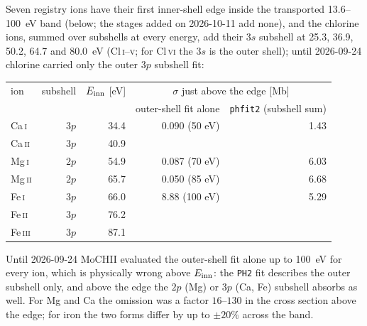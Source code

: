 \documentclass[english,a4paper]{my_memo}
\newcommand{\code}[1]{\texttt{#1}}
\begin{document}
Seven registry ions have their first inner-shell edge inside the
transported 13.6--100~eV band (below; the stages added on 2026-10-11 add
none), and the chlorine ions, summed over subshells at every energy, add
their $3s$ subshell at 25.3, 36.9, 50.2, 64.7 and 80.0~eV
(Cl\,\textsc{i}--\textsc{v}; for Cl\,\textsc{vi} the $3s$ is the outer
shell); until 2026-09-24 chlorine carried only the outer $3p$ subshell fit:
\begin{center}\small
\begin{tabular}{@{}lrrrr@{}}
\toprule
ion & subshell & $E_{\rm inn}$ [eV] & \multicolumn{2}{c}{$\sigma$ just above the edge [Mb]} \\
    &          &                   & outer-shell fit alone & \code{phfit2} (subshell sum) \\
\midrule
Ca\,\textsc{i}   & $3p$ & 34.4 & 0.090 (50 eV)  & 1.43 \\
Ca\,\textsc{ii}  & $3p$ & 40.9 & & \\
Mg\,\textsc{i}   & $2p$ & 54.9 & 0.087 (70 eV)  & 6.03 \\
Mg\,\textsc{ii}  & $2p$ & 65.7 & 0.050 (85 eV)  & 6.68 \\
Fe\,\textsc{i}   & $3p$ & 66.0 & 8.88 (100 eV)  & 5.29 \\
Fe\,\textsc{ii}  & $3p$ & 76.2 & & \\
Fe\,\textsc{iii} & $3p$ & 87.1 & & \\
\bottomrule
\end{tabular}
\end{center}
Until 2026-09-24 MoCHII evaluated the outer-shell fit alone up to 100~eV
for every ion, which is physically wrong above $E_{\rm inn}$: the
\code{PH2} fit describes the outer subshell only, and above the edge the
$2p$ (Mg) or $3p$ (Ca, Fe) subshell absorbs as well.  For Mg and Ca the
omission was a factor $16$--$130$ in the cross section above the edge; for
iron the two forms differ by up to $\pm20\%$ across the band.
\end{document}

